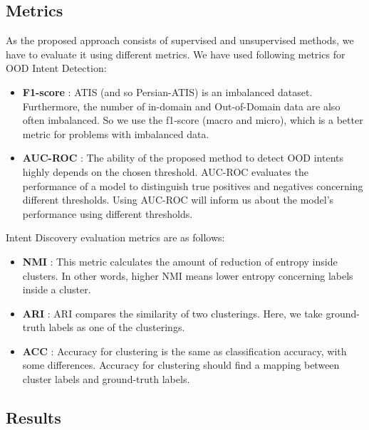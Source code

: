 \documentclass{article}
\begin{document}
\subsection{Metrics}

\noindent As the proposed approach consists of supervised and unsupervised methods, we have to evaluate it using different metrics.
We have used following metrics for OOD Intent Detection:
\begin{itemize}
  \item \textbf{F1-score} : ATIS (and so Persian-ATIS) is an imbalanced dataset. 
                          Furthermore, the number of in-domain and Out-of-Domain data are also often imbalanced. 
                          So we use the f1-score (macro and micro), which is a better metric for problems with imbalanced data.  
  \item \textbf{AUC-ROC} : The ability of the proposed method to detect OOD intents highly depends on the chosen threshold. 
                          AUC-ROC evaluates the performance of a model to distinguish true positives and negatives concerning different thresholds. 
                          Using AUC-ROC will inform us about the model's performance using different thresholds.
\end{itemize}
Intent Discovery evaluation metrics are as follows:
\begin{itemize}
  \item \textbf{NMI} : This metric calculates the amount of reduction of entropy inside clusters. In other words, higher NMI means lower entropy concerning labels inside a cluster.
  \item \textbf{ARI} : ARI compares the similarity of two clusterings. Here, we take ground-truth labels as one of the clusterings.
  \item \textbf{ACC} : Accuracy for clustering is the same as classification accuracy, with some differences. Accuracy for clustering should find a mapping between cluster labels and ground-truth labels.
\end{itemize}

\subsection{Results}
\end{document}
